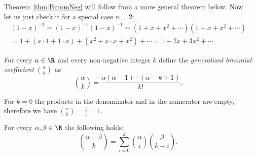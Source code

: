 \begin{page}
\setcounter{section}{2}
\setcounter{subsection}{4}
\setcounter{dfn}{14}
\label{portion:866}


Theorem \ref{thm:BinomNeg} will follow from a more general theorem below.
Now let us just check it for a special case $n=2$:
\begin{multline*}
(1-x)^{-2} = (1-x)^{-1} (1-x)^{-1} = (1 + x + x^2 + \cdots)(1 + x + x^2 + \cdots)\\
= 1 + (x \cdot 1 + 1 \cdot x) + (x^2 + x \cdot x + x^2) + \cdots
= 1 + 2x + 3x^2 + \cdots
\end{multline*}


\end{page}

\begin{page}
\setcounter{section}{2}
\setcounter{subsection}{4}
\setcounter{dfn}{15}
\label{portion:868}

\begin{dfn}
For every $\alpha \in \R$ and every non-negative integer $k$ define the \emph{generalized binomial coefficient} $\binom{\alpha}{k}$ as
\[
\binom{\alpha}{k} = \frac{\alpha(\alpha - 1) \cdots (\alpha - k + 1)}{k!}.
\]
\end{dfn}

\end{page}

\begin{page}
\setcounter{section}{2}
\setcounter{subsection}{4}
\setcounter{dfn}{15}
\label{portion:869}

For $k = 0$ the products in the denominator and in the numerator are empty, therefore we have $\binom{\alpha}{k} = \frac{1}{1} = 1$.


\end{page}

\begin{page}
\setcounter{section}{2}
\setcounter{subsection}{4}
\setcounter{dfn}{16}
\label{portion:871}

\begin{thm}
\label{thm:Vandermonde}
For every $\alpha, \beta \in \R$ the following holds:
\[
\binom{\alpha + \beta}{k} = \sum_{i=0}^k \binom{\alpha}{i} \binom{\beta}{k-i}.
\]
\end{thm}

\end{page}

